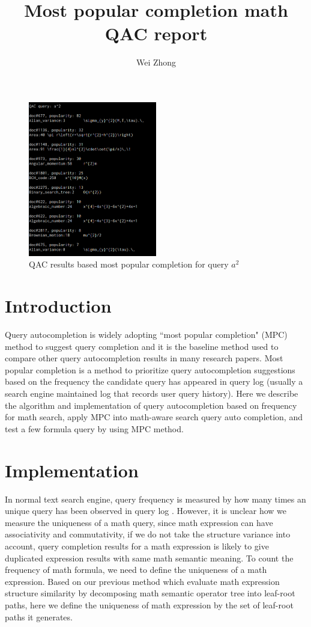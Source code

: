 \documentclass[a4paper]{article}
\title{Most popular completion math QAC report}
\author{Wei Zhong}
\begin{document}
\maketitle

\begin{figure}
\centering
\includegraphics[width=0.5\textwidth]{qac-results.png}
\caption{\label{fig:qac}QAC results based most popular completion for query $a^2$}
\end{figure}

\section{Introduction}

Query autocompletion is widely adopting ``most popular completion" (MPC) method \cite{Bar-Yossef:2011} to suggest query completion and it is the baseline method used to compare other query autocompletion results in many research papers. Most popular completion is a method to prioritize query autocompletion suggestions based on the frequency the candidate query has appeared in query log (usually a search engine maintained log that records user query history). Here we describe the algorithm and implementation of query autocompletion based on frequency for math search, apply MPC into math-aware search query auto completion, and test a few formula query by using MPC method.

\section{Implementation}
In normal text search engine, query frequency is measured by how many times an unique query has been observed in query log \cite{cai_survey_2016}. However, it is unclear how we measure the uniqueness of a math query, since math expression can have associativity and commutativity, if we do not take the structure variance into account, query completion results for a math expression is likely to give duplicated expression results with same math semantic meaning.
To count the frequency of math formula, we need to define the uniqueness of a math expression. Based on our previous method which evaluate math expression structure similarity by decomposing math semantic operator tree into leaf-root paths, here we define the uniqueness of math expression by the set of leaf-root paths it generates.
\end{document}

